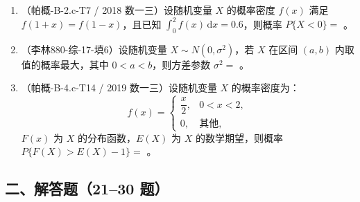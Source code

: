 \documentclass[12pt,a4paper]{ctexart}
\begin{document}
\begin{enumerate}[label=\arabic*.]
\item（帕概-B-2.c-T7 / 2018 数一三）设随机变量 $X$ 的概率密度 $f(x)$ 满足 $f(1 + x) = f(1 - x)$，且已知 $\int_{0}^{2} f(x)\,\mathrm{d}x = 0.6$，则概率 $P\{X < 0\} = $ \underline{\hspace{5em}}。

\item（李林880-综-17-填6）设随机变量 $X \sim N(0, \sigma^{2})$，若 $X$ 在区间 $(a, b)$ 内取值的概率最大，其中 $0 < a < b$，则方差参数 $\sigma^{2} = $ \underline{\hspace{5em}}。

\item（帕概-B-4.c-T14 / 2019 数一三）设随机变量 $X$ 的概率密度为：
\[
f(x) = \begin{cases} \dfrac{x}{2}, & 0 < x < 2, \\ 0, & \text{其他}, \end{cases}
\]
$F(x)$ 为 $X$ 的分布函数，$E(X)$ 为 $X$ 的数学期望，则概率 $P\{F(X) > E(X) - 1\} = $ \underline{\hspace{5em}}。

\end{enumerate}

\subsection*{二、解答题（21--30 题）}

\end{document}
